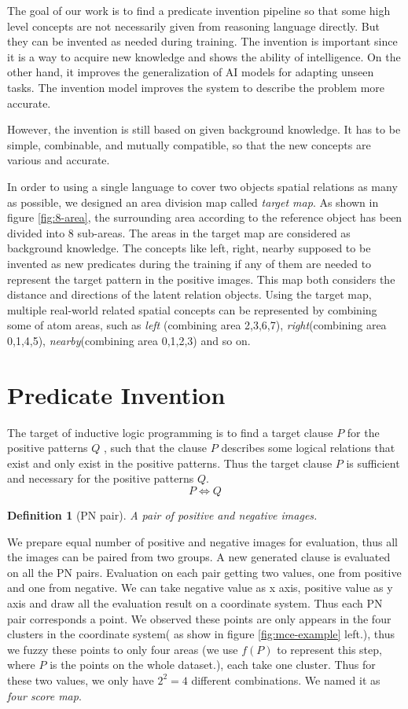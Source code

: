 \documentclass[
]{ceurart}
\newtheorem{definition}{Definition}[section]
\begin{document}
The goal of our work is to find a predicate invention pipeline so that some high level concepts are not necessarily given from reasoning language directly. But they can be invented as needed during training. The invention is important since it is a way to acquire new knowledge and shows the ability of intelligence. On the other hand, it improves the generalization of AI models for adapting unseen tasks. The invention model improves the system to describe the problem more accurate.

However, the invention is still based on given background knowledge. It has to be simple, combinable,  and mutually compatible, so that the new concepts are various and accurate.

In order to using a single language to cover two objects spatial relations as many as possible, we designed an area division map called \textit{target map}. As shown in figure \ref{fig:8-area}, the surrounding area according to the reference object has been divided into 8 sub-areas. 
The areas in the target map are considered as background knowledge. The concepts like left, right, nearby supposed to be invented as new predicates during the training if any of them are needed to represent the target pattern in the positive images.  This map both considers the distance and directions of the latent relation objects. 
Using the target map, multiple real-world related spatial concepts can be represented by combining some of atom areas, such as 
\textit{left} (combining area 2,3,6,7), 
\textit{right}(combining area 0,1,4,5), 
\textit{nearby}(combining area 0,1,2,3) and so on. 

\newpage
\section{Predicate Invention}


The target of inductive logic programming is to find a target clause $ P $ for the positive patterns $ Q $ , such that the clause $ P $ describes some logical relations that exist and only exist in the positive patterns. 
Thus the target clause $ P $ is sufficient and necessary for the positive patterns $ Q $.
\[ P\Leftrightarrow Q \]


\begin{definition}[PN pair]
	A pair of positive and negative images.
\end{definition}
We prepare equal number of positive and negative images for evaluation, thus all the images can be paired from two groups.
A new generated clause is evaluated on all the PN pairs. Evaluation on each pair getting two values, one from positive and one from negative. 
 We can take negative value as x axis, positive value as y axis and draw all the evaluation result on a coordinate system. Thus each PN pair corresponds a point. We observed these points are only appears in the four clusters in the coordinate system( as show in figure \ref{fig:mce-example} left.), thus we fuzzy these points to only four areas (we use $ f(P) $ to represent this step, where $ P $ is the points on the whole dataset.), each take one cluster. Thus for these two values, we only have $ 2^2=4 $ different combinations. We named it as \textit{four score map}.  
 
\end{document}
